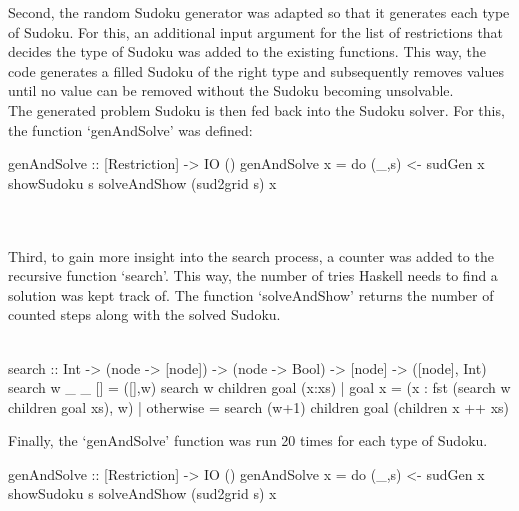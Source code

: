 \documentclass[12pt,a4paper]{article}
\begin{document}
Second, the random Sudoku generator was adapted so that it generates each type of
Sudoku. For this, an additional input argument for the list of restrictions that
decides the type of Sudoku was added to the existing functions. This way,
the code generates a filled Sudoku of the right type and subsequently removes values
until no value can be removed without the Sudoku becoming unsolvable.\\
The generated problem Sudoku is then fed back into the Sudoku solver. For this, the function
`genAndSolve' was defined:
\begin{code}
genAndSolve :: [Restriction] -> IO ()
genAndSolve x = do (_,s) <- sudGen x
                   showSudoku s
                   solveAndShow (sud2grid s) x
\end{code}\\\\
Third, to gain more insight into the search process, a counter was added to the recursive function `search'.
This way, the number of tries Haskell needs to find a solution was kept track of.
The function `solveAndShow' returns the number of counted steps along
with the solved Sudoku.\\\\
\begin{code}
search :: Int -> (node -> [node])
        -> (node -> Bool) -> [node] -> ([node], Int)
search w _ _ [] = ([],w)
search w children goal (x:xs)
  | goal x    = (x : fst (search w children goal xs), w)
  | otherwise = search (w+1) children goal (children x ++ xs)
\end{code}
Finally, the `genAndSolve' function was run 20 times for each type of Sudoku.
\begin{code}
genAndSolve :: [Restriction] -> IO ()
genAndSolve x = do (_,s) <- sudGen x
                  showSudoku s
                  solveAndShow (sud2grid s) x
\end{code}
\end{document}
